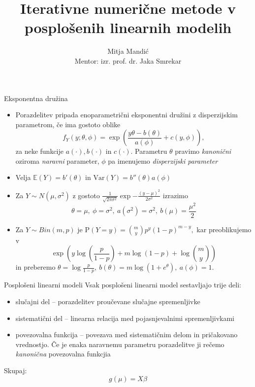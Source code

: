 \documentclass[10pt]{beamer}
\begin{document}
    \title[Diplomski seminar]{Iterativne numerične metode v posplošenih linearnih modelih}
    \author{Mitja Mandić \\ \small Mentor: izr. prof. dr. Jaka Smrekar}

\begin{frame}
    \titlepage
\end{frame}

\begin{frame}{Eksponentna družina}
    \begin{itemize}
        \item<1->Porazdelitev pripada enoparametrični eksponentni družini z disperzijskim parametrom, če
        ima gostoto oblike
            \begin{equation*}
            f_{Y}(y; \theta, \phi) = \exp{\left(\frac{y\theta - b(\theta)}{a(\phi)} + c(y, \phi)\right)},
        \end{equation*}
        za neke funkcije $a(\cdot), b(\cdot)\text{~in~}c(\cdot).$ Parametru $\theta$ pravimo \textit{kanonični} oziroma \textit{naravni} parameter,
        $\phi$ pa imenujemo \textit{disperzijski parameter}
        \item Velja $\mathbb{E}(Y) = b'(\theta)$ in $\mathrm{Var}(Y) = b''(\theta)a(\phi)$\pause
        \item Za $Y\sim N(\mu,\sigma^2)$ z gostoto $\tfrac{1}{\sqrt{2\pi\sigma^2}}\exp{-\tfrac{(y-\mu)^2}{2\sigma^2}}$
         izrazimo
        \[
            \theta = \mu,~\phi = \sigma^2,~a(\sigma^2)=\sigma^2,~b(\mu) = \frac{\mu^2}{2}
        \] \pause
        \item Za $Y\sim Bin(m,p)$ je $\mathrm{P}(Y = y) = \binom{m}{y}p^y(1-p)^{m-y},$ kar preoblikujemo v        \[
        \exp\left(y\log\left(\frac{p}{1-p}\right) + m\log(1-p) + \log{\binom{m}{y}}\right)
        \] in preberemo $\theta = \log\frac{p}{1-p},~b(\theta) = m\log(1 + e^{\theta}),~a(\phi) = 1.$
    \end{itemize}
\end{frame}


\begin{frame}{Posplošeni linearni modeli}    
Vsak posplošeni linearni model sestavljajo trije deli:
\begin{itemize}
    \item \alert{slučajni del} -- porazdelitev proučevane slučajne spremenljivke \pause
    \item \alert{sistematični del} -- linearna relacija med pojasnjevalnimi spremenljivkami \pause
    \item \alert{povezovalna funkcija} -- povezava med sistematičnim delom in pričakovano vrednostjo. Če je enaka naravnemu parametru
    porazdelitve ji rečemo \textit{kanonična} povezovalna funkcjia \pause
\end{itemize}
Skupaj:
\[
    g(\mu) = X\beta
\]
\end{frame}
\end{document}
